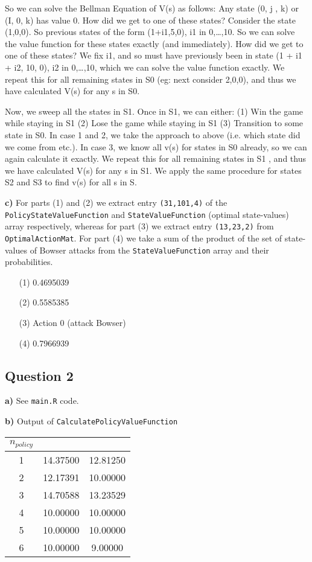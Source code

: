 \documentclass[a4paper,12pt]{article}
\def\code#1{\texttt{#1}}
\begin{document}
So we can solve the Bellman Equation of V(s) as follows: 
Any state (0, j , k) or (I, 0, k)  has value 0. How did we get to one of 
these states? Consider the state (1,0,0). So previous states of the form 
(1+i1,5,0), i1 in {0,…,10}. So we can solve the value function for these 
states exactly (and immediately). How did we get to one of these states? 
We fix i1, and so must have previously been in state (1 + i1 + i2, 10, 0),
i2 in {0,…,10}, which we can solve the value function exactly. We repeat 
this for all remaining states in S0 (eg: next consider {2,0,0}), and thus
we have calculated V(s) for any s in S0. 

Now, we sweep all the states in S1. Once in S1, we can either: (1) Win the
game while staying in S1 (2) Lose the game while staying in S1 (3) Transition 
to some state in S0. In case 1 and 2, we take the approach to above (i.e. 
which state did we come from etc.). In case 3, we know all v(s) for states 
in S0 already, so we can again calculate it exactly. We repeat this for all 
remaining states in S1 , and thus we have calculated V(s) for any s in S1. 
We apply the same procedure for states S2 and S3 to find v(s) for all s in S.

\textbf{c)} For parts (1) and (2) we extract entry \code{(31,101,4)} of the 
\code{PolicyStateValueFunction} and \code{StateValueFunction} (optimal state-values) array respectively, whereas for part (3) 
we extract entry \code{(13,23,2)} from \code{OptimalActionMat}. For part (4) we take a sum of the product of 
the set of state-values of Bowser attacks from the \code{StateValueFunction} array and their probabilities.

\begin{itemize}
  \item [(1)] 0.4695039
  \item [(2)] 0.5585385
  \item [(3)] Action 0 (attack Bowser)
  \item [(4)] 0.7966939
\end{itemize}

\subsection*{Question 2}

\textbf{a)} See \code{main.R} code.

\textbf{b)} Output of \code{CalculatePolicyValueFunction}

\begin{longtable}{|c|c|c|}
	\hline
	$n_{policy}$ & \text{State 1 Value} & \text{State 2 Value} \\ \hline
	1 & 14.37500 & 12.81250 \\ \hline
	2 & 12.17391 & 10.00000 \\ \hline
	3 & 14.70588 & 13.23529 \\ \hline
	4 & 10.00000 & 10.00000 \\ \hline
	5 & 10.00000 & 10.00000\\ \hline
	6 & 10.00000 & 9.00000 \\ \hline
\end{longtable}
\end{document}
